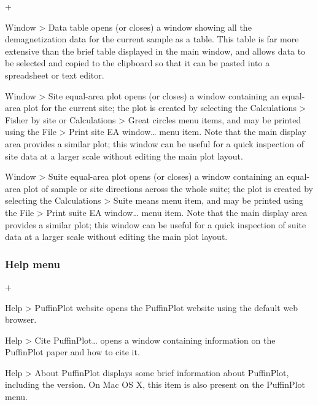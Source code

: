 \documentclass[a4paper,british]{article}
\newcommand{\menuitemlabel}[1]{%
\mbox{\textsf{#1}}\hfil}
\newenvironment{menuitemlist}%
{\begin{list}{}{%
\renewcommand{\makelabel}{\menuitemlabel}%
\setlength{\labelwidth}{35pt}%
\setlength{\leftmargin}%
             {\labelwidth+\labelsep}}}%
{\end{list}}
\newcommand{\ppcmd}[1]{\textsf{#1}} %
\newcommand{\submenu}{ \textgreater{} } %
\begin{document}
\begin{menuitemlist}

\item[Window\submenu Data table] opens (or closes) a window showing
all the demagnetization data for the current sample as a table. This
table is far more extensive than the brief table displayed in the
main window, and allows data to be selected and copied to the clipboard
so that it can be pasted into a spreadsheet or text editor.

\item[Window\submenu Site equal-area plot] opens (or closes) a window
  containing an equal-area plot for the current site; the plot is created by
  selecting the \ppcmd{Calculations\submenu Fisher by site} or
  \ppcmd{Calculations\submenu Great circles} menu items, and may be printed
  using the \ppcmd{File\submenu Print site EA window\ldots} menu item. Note
  that the main display area provides a similar plot; this window can be
  useful for a quick inspection of site data at a larger scale without
  editing the main plot layout.

\item[Window\submenu Suite equal-area plot] opens (or closes) a window
  containing an equal-area plot of sample or site directions across the whole
  suite; the plot is created by selecting the \ppcmd{Calculations\submenu
    Suite means} menu item, and may be printed using the
  \ppcmd{File\submenu Print suite EA window\ldots} menu item. Note that the
  main display area provides a similar plot; this window can be useful for a
  quick inspection of suite data at a larger scale without editing the main
  plot layout.

\end{menuitemlist}

\subsubsection{Help menu}

\begin{menuitemlist}

\item[Help\submenu PuffinPlot website] opens the PuffinPlot website 
using the default web browser.

\item[Help\submenu Cite PuffinPlot\ldots] opens a window containing
information on the PuffinPlot paper \citep{lurcock2012puffinplot}
and how to cite it.

\item[Help\submenu About PuffinPlot] displays some brief information
about PuffinPlot, including the version. On Mac OS X, this item is
also present on the \ppcmd{PuffinPlot} menu.

\end{menuitemlist}
\end{document}
